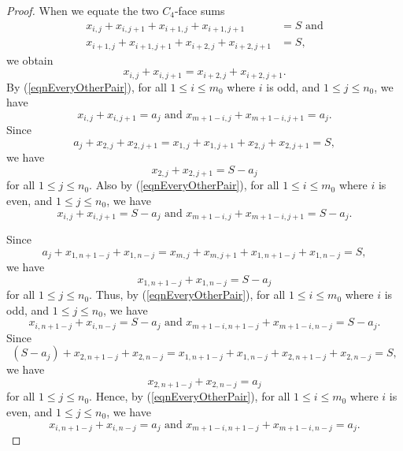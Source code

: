 \documentclass[12pt]{amsart}
\theoremstyle{definition}
\theoremstyle{plain}
\begin{document}
\begin{proof}
  When we equate the two $C_4$-face sums
  \begin{align*}
    x_{i,j} + x_{i,j+1} +  x_{i+1,j} + x_{i+1,j+1}  &= S \mbox{ \ and} \\
     x_{i+1,j} + x_{i+1,j+1} + x_{i+2,j} + x_{i+2,j+1} &=S,
  \end{align*}
  we obtain
  \begin{equation} \label{eqnEveryOtherPair}
     x_{i,j} + x_{i,j+1}  =  x_{i+2,j} + x_{i+2,j+1}.
  \end{equation}
  By (\ref{eqnEveryOtherPair}), for all $1 \leqslant i \leqslant m_0$ where $i$ is odd, and $1\leqslant j \leqslant n_0$, we have
  \begin{equation*}
    x_{i,j} + x_{i,j+1} = a_j \mbox{ \ and \ }  x_{m+1-i,j} + x_{m+1-i,j+1} = a_j.
  \end{equation*}
  Since
  \begin{equation*}
    a_j + x_{2,j} + x_{2,j+1} = x_{1,j} +x_{1,j+1} + x_{2,j} +x_{2,j+1} = S,
  \end{equation*}
  we have
  \begin{equation*}
    x_{2,j} + x_{2,j+1} = S- a_j
  \end{equation*}
  for all $1 \leqslant j \leqslant n_0$.
  Also by (\ref{eqnEveryOtherPair}), for all $1 \leqslant i \leqslant m_0$ where $i$ is even, and $1\leqslant j \leqslant n_0$, we have
  \begin{equation*}
    x_{i,j} + x_{i,j+1} = S-a_j \mbox{ \ and \ }  x_{m+1-i,j} + x_{m+1-i,j+1} = S-a_j.
  \end{equation*}

  Since
  \begin{equation*}
    a_j + x_{1,n+1-j} + x_{1,n-j} = x_{m,j} +x_{m,j+1} + x_{1,n+1-j} +x_{1,n-j} = S,
  \end{equation*}
  we have
  \begin{equation*}
    x_{1,n+1-j} +x_{1,n-j} = S- a_j
  \end{equation*}
  for all $1 \leqslant j \leqslant n_0$.
  Thus, by (\ref{eqnEveryOtherPair}), for all $1 \leqslant i \leqslant m_0$ where $i$ is odd, and $1\leqslant j \leqslant n_0$, we have
  \begin{equation*}
    x_{i,n+1-j} + x_{i,n-j} = S - a_j \mbox{ \ and \ }  x_{m+1-i,n+1-j} + x_{m+1-i,n-j} = S - a_j.
  \end{equation*}
  Since
  \begin{equation*}
    (S -a_j) + x_{2,n+1-j} + x_{2,n-j} =  x_{1,n+1-j} +x_{1,n-j} + x_{2,n+1-j} + x_{2,n-j}  = S,
  \end{equation*}
  we have
  \begin{equation*}
    x_{2,n+1-j} + x_{2,n-j}  = a_j
  \end{equation*}
  for all $1 \leqslant j \leqslant n_0$.
  Hence, by (\ref{eqnEveryOtherPair}), for all $1 \leqslant i \leqslant m_0$ where $i$ is even, and $1\leqslant j \leqslant n_0$, we have
  \begin{equation*}
    x_{i,n+1-j} + x_{i,n-j} = a_j \mbox{ \ and \ }  x_{m+1-i,n+1-j} + x_{m+1-i,n-j} = a_j.
  \end{equation*}
\end{proof}
\end{document}
